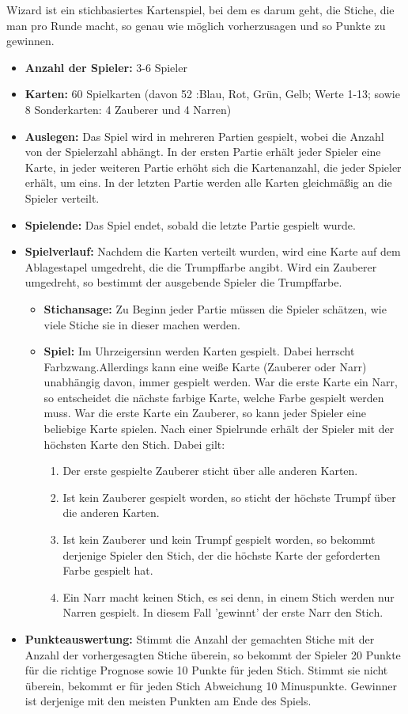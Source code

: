\documentclass[titlepage,10pt,a4paper]{article}
\begin{document}
Wizard ist ein stichbasiertes Kartenspiel, bei dem es darum geht, die Stiche, die man pro Runde macht, so genau wie möglich vorherzusagen und so Punkte zu gewinnen. 
\begin{itemize}
	\item \textbf{Anzahl der Spieler:} 3-6 Spieler
	\item \textbf{Karten:}  60 Spielkarten (davon 52 :Blau, Rot, Grün, Gelb; Werte 1-13; sowie 8 Sonderkarten: 4 Zauberer und 4 Narren)
	\item \textbf{Auslegen:} Das Spiel wird in mehreren Partien gespielt, wobei die Anzahl von der Spielerzahl abhängt. In der ersten Partie erhält jeder Spieler eine Karte, in jeder weiteren Partie erhöht sich die Kartenanzahl, die jeder Spieler erhält, um eins. In der letzten Partie werden alle Karten gleichmäßig an die Spieler verteilt.
	\item \textbf{Spielende:} Das Spiel endet, sobald die letzte Partie gespielt wurde.
	\item \textbf{Spielverlauf:} Nachdem die Karten verteilt wurden, wird eine Karte auf dem Ablagestapel umgedreht, die die \gls{Trumpf}farbe angibt. Wird ein Zauberer umgedreht, so bestimmt der ausgebende Spieler die \gls{Trumpf}farbe.
	\begin{itemize}
		\item \textbf{Stichansage:} Zu Beginn jeder Partie müssen die Spieler schätzen, wie viele Stiche sie in dieser machen werden.
		\item \textbf{Spiel:} Im Uhrzeigersinn werden Karten gespielt. Dabei herrscht \gls{Farbzwang}.Allerdings kann eine weiße Karte (Zauberer oder Narr) unabhängig davon, immer gespielt werden. War die erste Karte ein Narr, so entscheidet die nächste farbige Karte, welche Farbe gespielt werden muss. War die erste Karte ein Zauberer, so kann jeder Spieler eine beliebige Karte spielen. Nach einer \gls{Spielrunde} erhält der Spieler mit der höchsten Karte den Stich. Dabei gilt:
		\begin{enumerate}
			\item Der erste gespielte Zauberer sticht über alle anderen Karten.
			\item Ist kein Zauberer gespielt worden, so sticht der höchste \gls{Trumpf} über die anderen Karten.
			\item Ist kein Zauberer und kein \gls{Trumpf} gespielt worden, so bekommt derjenige Spieler den \gls{Stich}, der die höchste Karte der geforderten Farbe gespielt hat.
			\item Ein Narr macht keinen \gls{Stich}, es sei denn, in einem \gls{Stich} werden nur Narren gespielt. In diesem Fall 'gewinnt' der erste Narr den Stich.
		\end{enumerate}
	\end{itemize}
	\item \textbf{Punkteauswertung:} Stimmt die Anzahl der gemachten Stiche mit der Anzahl der vorhergesagten Stiche überein, so bekommt der Spieler 20 Punkte für die richtige Prognose sowie 10 Punkte für jeden Stich. Stimmt sie nicht überein, bekommt er für jeden Stich Abweichung 10 Minuspunkte. Gewinner ist derjenige mit den meisten Punkten am Ende des Spiels.
\end{itemize}
\end{document}
